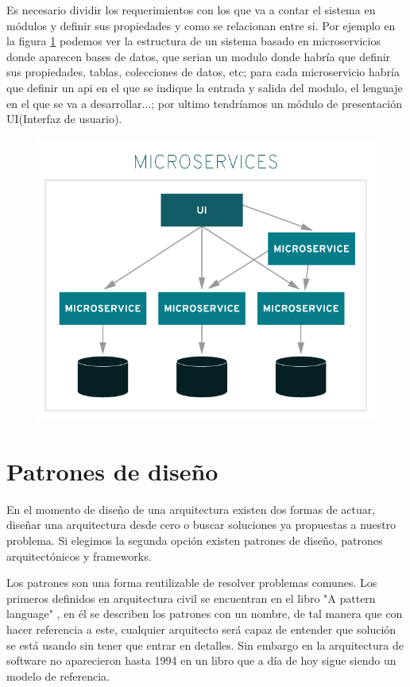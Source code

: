 \documentclass[12pt]{report} %
\begin{document}
	Es necesario dividir los requerimientos con los que va a contar el sistema en módulos y definir sus propiedades y como se relacionan entre si. Por ejemplo en la figura \ref{fig:microservices} podemos ver la estructura de un sistema basado en microservicios donde aparecen bases de datos, que serian un modulo donde habría que definir sus propiedades, tablas, colecciones de datos, etc; para cada microservicio habría que definir un api en el que se indique la entrada y salida del modulo, el lenguaje en el que se va a desarrollar...; por ultimo tendríamos un módulo de presentación UI(Interfaz de usuario).
	\begin{figure}
		\centering
		\includegraphics[width=0.7\linewidth]{imagenes/monolithic-vs-microservices}
		\caption{}
		\label{fig:microservices}
	\end{figure}

	\section{Patrones de diseño}
	 En el momento de diseño de una arquitectura existen dos formas de actuar, diseñar una arquitectura desde cero o buscar soluciones ya propuestas a nuestro problema. Si elegimos la segunda opción existen patrones de diseño, patrones arquitectónicos y frameworks.
	 
	 Los patrones son una forma reutilizable de resolver problemas comunes. Los primeros definidos en arquitectura civil se encuentran en el libro "A pattern language" \cite{PatternLanguage}, en él se describen los patrones con un nombre, de tal manera que con hacer referencia a este, cualquier arquitecto será capaz de entender que solución se está usando sin tener que entrar en detalles. Sin embargo en la arquitectura de software no aparecieron hasta 1994 en un libro que a día de hoy sigue siendo un modelo de referencia\cite{gamma2002patrones}.
	 
\end{document}
